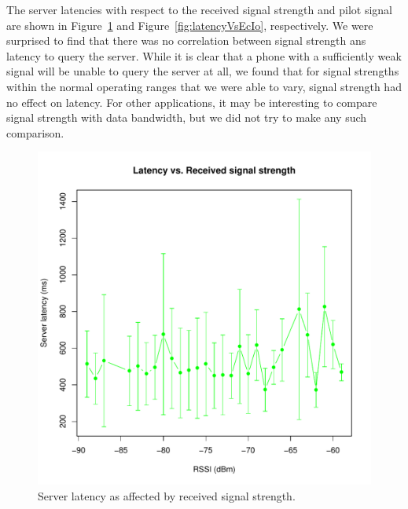 \documentclass{acm_proc_article-sp}
\begin{document}
The server latencies with respect to the received signal strength and pilot
signal are shown in Figure~\ref{fig:latencyVsRSSI} and
Figure~\ref{fig:latencyVsEcIo}, respectively. We were surprised to find that
there was no correlation between signal strength ans latency to query the
server. While it is clear that a phone with a sufficiently weak signal will be
unable to query the server at all, we found that for signal strengths within
the normal operating ranges that we were able to vary, signal strength had no
effect on latency. For other applications, it may be interesting to compare
signal strength with data bandwidth, but we did not try to make any such
comparison.

\begin{figure}
\centering
\includegraphics[scale=0.5]{figs/latencyVsRSSI}
\caption{Server latency as affected by received signal strength.}
\label{fig:latencyVsRSSI}
\end{figure}
\end{document}

